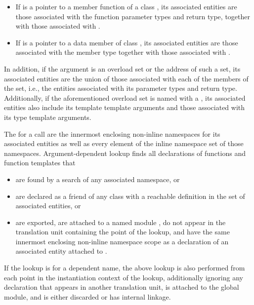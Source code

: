 \begin{itemize}
\item If  is a pointer to a member function of a class
, its associated entities are those associated
with the function parameter types and return type, together with those
associated with .

\item If  is a pointer to a data member of class , its
associated entities are those associated with the member
type together with those associated with .
\end{itemize}
In addition, if the argument is an overload set or the address of such a set,
its associated entities
are the union of those associated with each of the
members of the set, i.e., the entities associated with its
parameter types and return type.
Additionally, if the aforementioned overload set is named with
a , its associated entities also include
its template template arguments and
those associated with its type template arguments.

\pnum
The  for a call are
the innermost enclosing non-inline namespaces for its associated entities
as well as every element of the inline namespace set
of those namespaces.
Argument-dependent lookup finds
all declarations of functions and function templates that
\begin{itemize}
\item
are found by a search of any associated namespace, or
\item
are declared as a friend of any class
with a reachable definition in the set of associated entities, or
\item
are exported,
are attached to a named module ,
do not appear in the translation unit containing the point of the lookup, and
have the same innermost enclosing non-inline namespace scope as
a declaration of an associated entity attached to .
\end{itemize}
If the lookup is for a dependent name,
the above lookup is also performed
from each point in the instantiation context of the lookup,
additionally ignoring any declaration that
appears in another translation unit,
is attached to the global module, and
is either discarded or has internal linkage.

